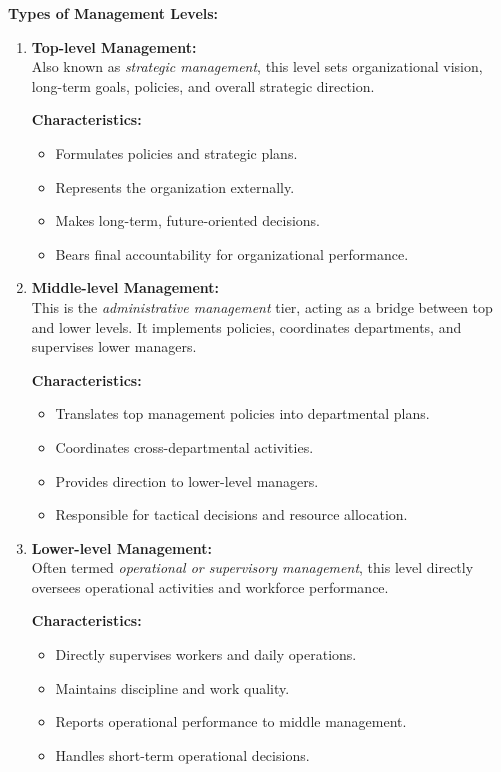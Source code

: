 \documentclass[10pt,a4paper]{book}
\begin{document}
\textbf{Types of Management Levels:}
\begin{enumerate}
    \item \textbf{Top-level Management:}\\
    Also known as \textit{strategic management}, this level sets organizational vision, long-term goals, policies, and overall strategic direction.
    
    \textbf{Characteristics:}
    \begin{itemize}
        \item Formulates policies and strategic plans.
        \item Represents the organization externally.
        \item Makes long-term, future-oriented decisions.
        \item Bears final accountability for organizational performance.
    \end{itemize}

    \item \textbf{Middle-level Management:}\\
    This is the \textit{administrative management} tier, acting as a bridge between top and lower levels. It implements policies, coordinates departments, and supervises lower managers.

    \textbf{Characteristics:}
    \begin{itemize}
        \item Translates top management policies into departmental plans.
        \item Coordinates cross-departmental activities.
        \item Provides direction to lower-level managers.
        \item Responsible for tactical decisions and resource allocation.
    \end{itemize}

    \item \textbf{Lower-level Management:}\\
    Often termed \textit{operational or supervisory management}, this level directly oversees operational activities and workforce performance.

    \textbf{Characteristics:}
    \begin{itemize}
        \item Directly supervises workers and daily operations.
        \item Maintains discipline and work quality.
        \item Reports operational performance to middle management.
        \item Handles short-term operational decisions.
    \end{itemize}
\end{enumerate}
\end{document}
